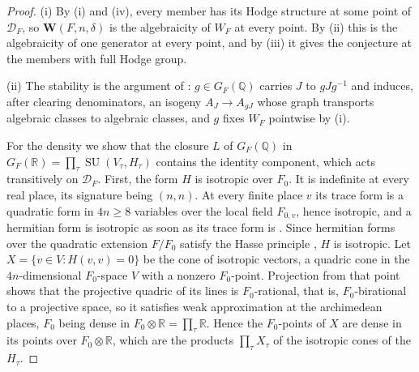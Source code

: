 \documentclass[11pt,reqno]{amsart}
\theoremstyle{plain}
\theoremstyle{definition}
\theoremstyle{remark}
\newcommand{\QQ}{\mathbb{Q}}
\newcommand{\RR}{\mathbb{R}}
\newcommand{\cD}{\mathcal{D}}
\DeclareMathOperator{\SU}{SU}
\begin{document}
\begin{proof}
(i) By (i) and (iv), every member has its Hodge structure
at some point of $\cD_{F}$, so $\mathbf{W}(F,n,\delta)$ is the algebraicity of
$W_{F}$ at every point. By (ii) this is the algebraicity of
one generator at every point, and by (iii) it gives the
conjecture at the members with full Hodge group.

(ii) The stability is the argument of : $g\in G_{F}(\QQ)$
carries $J$ to $gJg^{-1}$ and induces, after clearing denominators, an isogeny
$A_{J}\to A_{gJ}$ whose graph transports algebraic classes to algebraic
classes, and $g$ fixes $W_{F}$ pointwise by (i).

For the density we show that the closure $L$ of $G_{F}(\QQ)$ in
$G_{F}(\RR)=\prod_{\tau}\SU(V_{\tau},H_{\tau})$ contains the identity
component, which acts transitively on $\cD_{F}$. First, the form $H$ is
isotropic over $F_{0}$. It is indefinite at every real place, its signature
being $(n,n)$. At every finite place $v$ its trace form is a quadratic form
in $4n\ge8$ variables over the local field $F_{0,v}$, hence isotropic, and a
hermitian form is isotropic as soon as its trace form is
\cite[Ch.~10, \S1]{Sch85}. Since hermitian forms over the quadratic
extension $F/F_{0}$ satisfy the Hasse principle \cite[Ch.~10, \S6]{Sch85},
$H$ is isotropic. Let $X=\{v\in V:H(v,v)=0\}$ be the cone of isotropic
vectors, a quadric cone in the $4n$-dimensional $F_{0}$-space $V$ with a
nonzero $F_{0}$-point. Projection from that point shows that the projective
quadric of its lines is $F_{0}$-rational, that is, $F_{0}$-birational to a
projective space, so it satisfies weak approximation at the archimedean
places, $F_{0}$ being dense in $F_{0}\otimes\RR=\prod_{\tau}\RR$. Hence the
$F_{0}$-points of $X$ are dense in its points over $F_{0}\otimes\RR$, which
are the products $\prod_{\tau}X_{\tau}$ of the isotropic cones of the
$H_{\tau}$.


\end{proof}
\end{document}
